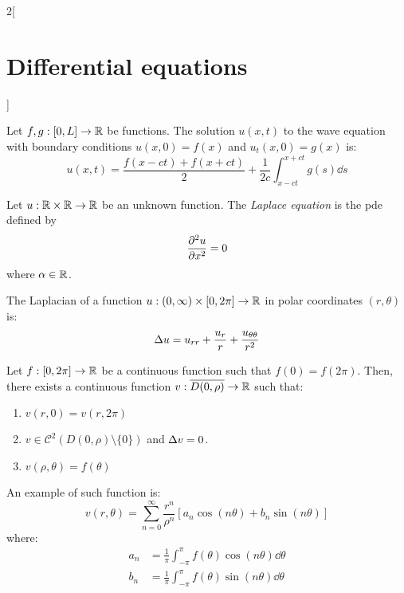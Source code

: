 \documentclass[../../../main.tex]{subfiles}
\begin{document}
\begin{multicols}{2}[\section{Differential equations}]
\begin{proposition}
    Let $f,g:[0,L]\rightarrow\mathbb{R}$ be functions. The solution $u(x,t)$ to the wave equation with boundary conditions $u(x,0)=f(x)$ and $u_t(x,0)=g(x)$ is: $$u(x,t)=\frac{f(x-ct)+f(x+ct)}{2}+\frac{1}{2c}\int_{x-ct}^{x+ct}g(s)\dd{s}$$
  \end{proposition}
  \begin{definition}
    Let $u:\mathbb{R}\times\mathbb{R}\rightarrow\mathbb{R}$ be an unknown function. The \emph{Laplace equation} is the pde defined by $$\pdv[2]{u}{x}=0$$ where $\alpha\in\mathbb{R}$.
  \end{definition}
  \begin{proposition}
    The Laplacian of a function $u:(0,\infty)\times[0,2\pi]\rightarrow\mathbb{R}$ in polar coordinates $(r,\theta)$ is: $$\Delta u=u_{rr}+\frac{u_r}{r}+\frac{u_{\theta\theta}}{r^2}$$
  \end{proposition}
  \begin{proposition}
    Let $f:[0,2\pi]\rightarrow\mathbb{R}$ be a continuous function such that $f(0)=f(2\pi)$. Then, there exists a continuous function $v:\overline{D(0,\rho)}\rightarrow\mathbb{R}$ such that:
    \begin{enumerate}
      \item $v(r,0)=v(r,2\pi)$
      \item $v\in\mathcal{C}^2(D(0,\rho)\setminus\{0\})$ and $\Delta v=0$.
      \item $v(\rho,\theta)=f(\theta)$
    \end{enumerate}
    An example of such function is:
    $$v(r,\theta)=\sum_{n=0}^\infty \frac{r^n}{\rho^n}\left[a_n\cos\left(n\theta\right)+ b_n\sin\left(n\theta\right)\right]$$ where:
    \begin{align*}
      a_n & =\frac{1}{\pi}\int_{-\pi}^\pi f(\theta)\cos\left(n\theta\right)\dd{\theta} \\
      b_n & =\frac{1}{\pi}\int_{-\pi}^\pi f(\theta)\sin\left(n\theta\right)\dd{\theta}
    \end{align*}
  \end{proposition}
\end{multicols}
\end{document}
